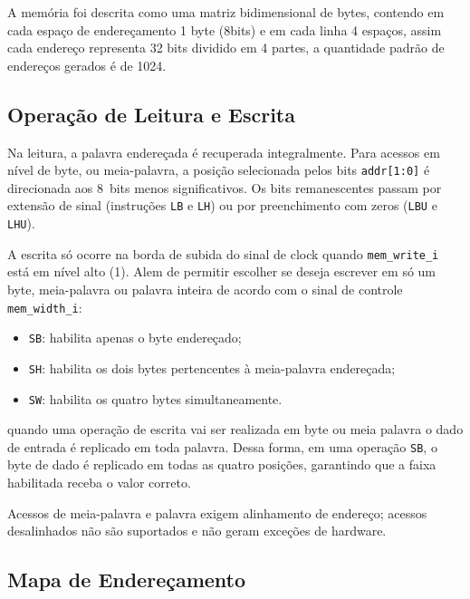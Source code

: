 A memória foi descrita como uma matriz bidimensional de bytes, contendo em cada espaço de endereçamento 1 byte (8bits) e em cada linha 4 espaços, assim cada endereço representa 32 bits dividido em 4 partes, a quantidade padrão de endereços gerados é de 1024.

\subsection{Operação de Leitura e Escrita}
\label{sub:escritaLeitura}

Na leitura, a palavra endereçada é recuperada integralmente. Para acessos em nível de byte, ou meia-palavra, a posição selecionada pelos bits \texttt{addr[1:0]} é direcionada aos 8~bits menos significativos. Os bits remanescentes passam por extensão de sinal (instruções \texttt{LB} e \texttt{LH}) ou por preenchimento com zeros (\texttt{LBU} e \texttt{LHU}).

 A escrita só ocorre na borda de subida do sinal de clock quando \texttt{mem\_write\_i} está em nível alto (1). Alem de permitir escolher se deseja escrever em só um byte, meia-palavra ou palavra inteira de acordo com o sinal de controle \texttt{mem\_width\_i}:
\begin{itemize}
    \item \texttt{SB}: habilita apenas o byte endereçado;
    \item \texttt{SH}: habilita os dois bytes pertencentes à meia-palavra endereçada;
    \item \texttt{SW}: habilita os quatro bytes simultaneamente.
\end{itemize}

quando uma operação de escrita vai ser realizada em byte ou meia palavra o dado de entrada é replicado em toda palavra. Dessa forma, em uma operação \texttt{SB}, o byte de dado é replicado em todas as quatro posições, garantindo que a faixa habilitada receba o valor correto. 

Acessos de meia-palavra e palavra exigem alinhamento de endereço; acessos desalinhados não são suportados e não geram exceções de hardware.

\subsection{Mapa de Endereçamento}
\label{sub:enderecamento}

